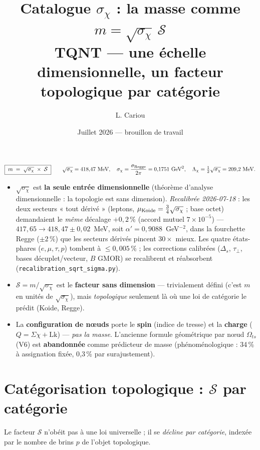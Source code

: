 \documentclass[11pt]{article}
\title{Catalogue $\sigma_\chi$ : la masse comme $m=\sqrt{\sigma_\chi}\,\mathcal{S}$\\
\large TQNT --- une échelle dimensionnelle, un facteur topologique par catégorie}
\author{L. Cariou}
\date{Juillet 2026 --- brouillon de travail}
\begin{document}
\maketitle

\begin{tcolorbox}[colback=blue!5,colframe=blue!50!black,title=Équation maîtresse]
\[
\boxed{\; m \;=\; \sqrt{\sigma_\chi}\;\times\;\mathcal{S} \;}
\qquad
\sqrt{\sigma_\chi}=418{,}47~\text{MeV},\quad
\sigma_\chi=\frac{\sigma_{\rm Regge}}{2\pi}=0{,}1751~\text{GeV}^2,\quad
\Lambda_\chi=\tfrac12\sqrt{\sigma_\chi}=209{,}2~\text{MeV}.
\]
\begin{itemize}\itemsep2pt
\item $\sqrt{\sigma_\chi}$ est \textbf{la seule entrée dimensionnelle} (théorème d'analyse dimensionnelle : la topologie est sans dimension). \emph{Recalibrée 2026-07-18} : les deux secteurs « tout dérivé » (leptons, $\mu_{\rm Koide}=\tfrac34\sqrt{\sigma_\chi}$ ; base octet) demandaient le \emph{même} décalage $+0{,}2\,\%$ (accord mutuel $7\times10^{-5}$) --- $417{,}65\to418{,}47\pm0{,}02$~MeV, soit $\alpha'=0{,}9088$~GeV$^{-2}$, dans la fourchette Regge ($\pm2\,\%$) que les secteurs dérivés pincent $30\times$ mieux. Les quatre états-phares ($e,\mu,\tau,p$) tombent à $\leq0{,}005\,\%$ ; les corrections calibrées ($\Delta_s$, $\tau_\perp$, bases décuplet/vecteur, $B$ GMOR) se recalibrent et réabsorbent (\texttt{recalibration\_sqrt\_sigma.py}).
\item $\mathcal{S}=m/\sqrt{\sigma_\chi}$ est le \textbf{facteur sans dimension} --- trivialement défini (c'est $m$ en unités de $\sqrt{\sigma_\chi}$), mais \emph{topologique} seulement là où une loi de catégorie le prédit (Koide, Regge).
\item La \textbf{configuration de nœuds} porte le \textbf{spin} (indice de tresse) et la \textbf{charge} ($Q=\Sigma\chi+\mathrm{Lk}$) --- \emph{pas la masse}. L'ancienne formule géométrique par nœud $\Omega_{ts}$ (V6) est \textbf{abandonnée} comme prédicteur de masse (phénoménologique : 34\,\% à assignation fixée, 0{,}3\,\% par surajustement).
\end{itemize}
\end{tcolorbox}

\section{Catégorisation topologique : $\mathcal{S}$ par catégorie}

Le facteur $\mathcal{S}$ n'obéit pas à une loi universelle ; il se \emph{décline par catégorie}, indexée par le nombre de brins $p$ de l'objet topologique.
\end{document}
